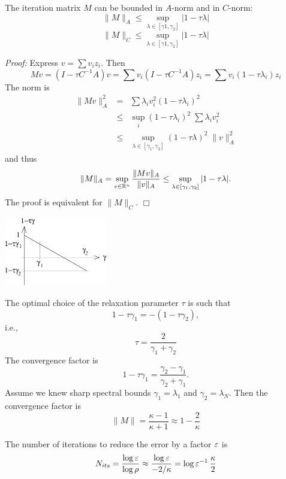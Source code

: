 \begin{lemma}
The iteration matrix $M$ can be bounded in $A$-norm and in $C$-norm:
$$
\| M \|_A \leq \sup_{\lambda \in [\gamma1, \gamma_2]} | 1 - \tau \lambda |
$$
$$
\| M \|_C \leq \sup_{\lambda \in [\gamma1, \gamma_2]} | 1 - \tau \lambda |
$$
\end{lemma}
{\em Proof:} Express $v = \sum v_i z_i$. Then
$$
M v = (I - \tau C^{-1} A) v = \sum v_i (I - \tau C^{-1} A) z_i
        = \sum v_i (1 - \tau \lambda_i) z_i
$$
The norm is
\begin{eqnarray*}
\| M v \|_A^2 & = & \sum \lambda_i v_i^2 (1-\tau \lambda_i)^2 \\
        & \leq & \sup_{i} (1-\tau \lambda_i)^2 \; \sum \lambda_i v_i^2 \\
        & \leq & \sup_{\lambda \in [\gamma_1, \gamma_2]} (1-\tau \lambda)^2 \; \| v \|_A^2
\end{eqnarray*}
and thus
$$
\| M \|_A = \sup_{v \in {\mathbb R}^n} \frac{ \| M v \|_A } { \| v \|_A } 
        \leq \sup_{\lambda \in [\gamma_1, \gamma_2]} | 1 - \tau \lambda|.
$$ 
The proof is equivalent for $\|M\|_C$.
\hfill $\Box$


\bigskip


\begin{center}
\includegraphics[height=3cm]{pictures/opttau}
\end{center}
The optimal choice of the relaxation parameter $\tau$ is such that
$$
1 - \tau \gamma_1  =  - (1-\tau \gamma_2), 
$$
i.e., 
$$
\tau = \frac{2}{\gamma_1 + \gamma_2}
$$
The convergence factor is
$$
1 - \tau \gamma_1 = \frac{\gamma_2 - \gamma_1}{\gamma_2 + \gamma_1}.
$$
Assume we knew sharp spectral bounds $\gamma_1 = \lambda_1$ and
$\gamma_2 = \lambda_N$. Then the convergence factor is
$$
\| M \| = \frac{\kappa-1}{\kappa+1} \approx 1 - \frac{2}{\kappa}
$$

The number of iterations to reduce the error by a factor $\varepsilon$ is
$$
N_{its} = \frac{\log \varepsilon}{\log \rho} \approx \frac {\log \varepsilon}{-2/\kappa}
        = \log \varepsilon^{-1} \, \frac{\kappa}{2}
$$



